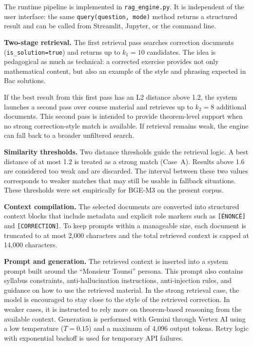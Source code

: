 The runtime pipeline is implemented in \texttt{rag\_engine.py}. It is
independent of the user interface: the same \texttt{query(question, mode)}
method returns a structured result and can be called from Streamlit,
Jupyter, or the command line.

\textbf{Two-stage retrieval.} The first retrieval pass searches correction
documents (\texttt{is\_solution=true}) and returns up to $k_1 = 10$
candidates. The idea is pedagogical as much as technical: a corrected
exercise provides not only mathematical content, but also an example of the
style and phrasing expected in Bac solutions.

If the best result from this first pass has an L2 distance above 1.2, the
system launches a second pass over course material and retrieves up to
$k_2 = 8$ additional documents. This second pass is intended to provide
theorem-level support when no strong correction-style match is available. If
retrieval remains weak, the engine can fall back to a broader unfiltered
search.

\textbf{Similarity thresholds.} Two distance thresholds guide the retrieval
logic. A best distance of at most 1.2 is treated as a strong match
(Case~A). Results above 1.6 are considered too weak and are discarded. The
interval between these two values corresponds to weaker matches that may
still be usable in fallback situations. These thresholds were set
empirically for BGE-M3 on the present corpus.

\textbf{Context compilation.} The selected documents are converted into
structured context blocks that include metadata and explicit role markers
such as \texttt{[\'ENONC\'E]} and \texttt{[CORRECTION]}. To keep prompts
within a manageable size, each document is truncated to at most 2{,}000
characters and the total retrieved context is capped at 14{,}000
characters.

\textbf{Prompt and generation.} The retrieved context is inserted into a
system prompt built around the ``Monsieur Tounsi'' persona. This prompt also
contains syllabus constraints, anti-hallucination instructions,
anti-injection rules, and guidance on how to use the retrieved material. In
the strong retrieval case, the model is encouraged to stay close to the
style of the retrieved correction. In weaker cases, it is instructed to rely
more on theorem-based reasoning from the available context. Generation is
performed with Gemini through Vertex AI using a low temperature
($T = 0.15$) and a maximum of 4{,}096 output tokens. Retry logic with
exponential backoff is used for temporary API failures.

